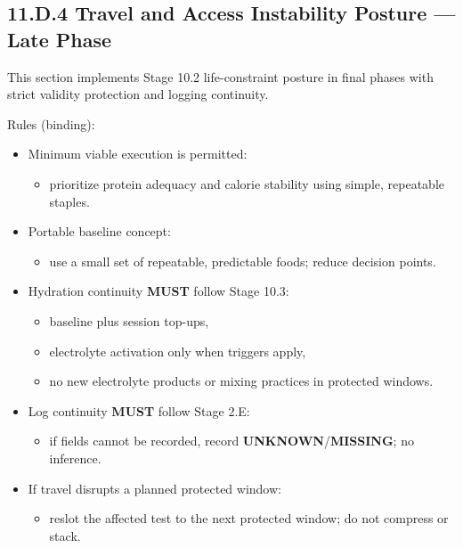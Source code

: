 \documentclass[10pt]{article}
\begin{document}
\endgroup

\newpage

\subsection*{11.D.4 Travel and Access Instability Posture — Late Phase}
{}

This section implements Stage 10.2 life-constraint posture in final phases with strict validity protection and logging continuity.

Rules (binding):

\begin{itemize}
\item Minimum viable execution is permitted:
\begin{itemize}
\item prioritize protein adequacy and calorie stability using simple, repeatable staples.
\end{itemize}
\item Portable baseline concept:
\begin{itemize}
\item use a small set of repeatable, predictable foods; reduce decision points.
\end{itemize}
\item Hydration continuity \textbf{MUST} follow Stage 10.3:
\begin{itemize}
\item baseline plus session top-ups,
\item electrolyte activation only when triggers apply,
\item no new electrolyte products or mixing practices in protected windows.
\end{itemize}
\item Log continuity \textbf{MUST} follow Stage 2.E:
\begin{itemize}
\item if fields cannot be recorded, record \textbf{UNKNOWN}/\textbf{MISSING}; no inference.
\end{itemize}
\item If travel disrupts a planned protected window:
\begin{itemize}
\item reslot the affected test to the next protected window; do not compress or stack.
\end{itemize}
\end{itemize}
\end{document}
